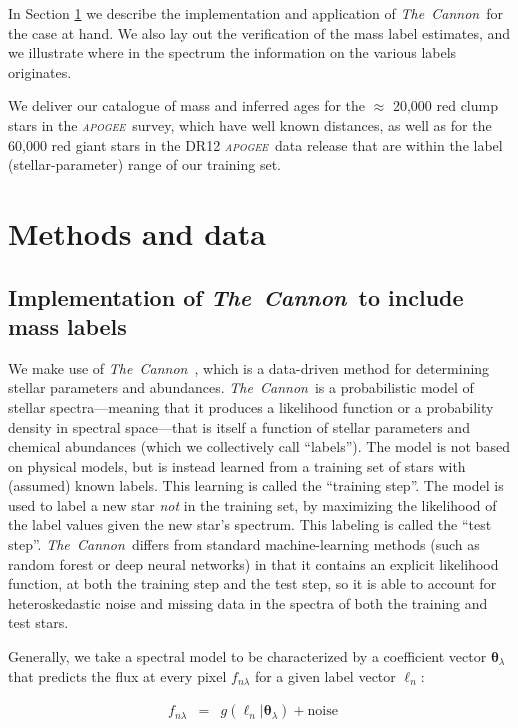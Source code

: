 \documentclass[12pt, preprint]{aastex}
\newcommand{\project}[1]{\textsl{#1}}
\newcommand{\tc}{\project{The~Cannon}}
\newcommand{\apogee}{\project{\textsc{apogee}}}
\newcommand{\set}[1]{\bm{#1}}
\newcommand{\starlabel}{\ell}
\newcommand{\starlabelvec}{\set{\starlabel}}
\begin{document}
In Section \ref{sec:methods} we describe the implementation and application of \tc\ for the case at hand. We also lay out the verification of the mass label estimates, and we illustrate where in the spectrum the information on the various labels originates. 

We deliver our catalogue of mass and inferred ages for the $\approx$ 20,000 red clump stars in the \apogee\ survey, which have well known distances, as well as for the 60,000 red giant stars in the DR12 \apogee\ data release that are within the label (stellar-parameter) range of our training set.


\section{Methods and data}
\label{sec:methods}

\subsection{Implementation of \tc\ to include mass labels}

We make use of \tc\ \citep{Ness2015}, which is a data-driven method for
determining stellar parameters and abundances.
\tc\ is a probabilistic model of stellar spectra---meaning that it
produces a likelihood function or a probability density in spectral
space---that is itself a function of stellar parameters and chemical
abundances (which we collectively call ``labels'').
The model is not based on physical models, but is instead learned
from a training set of stars with (assumed) known labels.
This learning is called the ``training step''.
The model is used to label a new star \emph{not} in the training set,
by maximizing the likelihood of the label values given the new star's
spectrum.
This labeling is called the ``test step''.
\tc\ differs from standard machine-learning methods
(such as random forest or deep neural networks) in that it contains an
explicit likelihood function, at both the training step and the test
step, so it is able to account for heteroskedastic noise and missing
data in the spectra of both the training and test stars.

Generally, we take a spectral model to be characterized by a coefficient vector $\set{\theta}_\lambda$
that predicts the flux at every pixel $f_{n\lambda}$ for a given label vector $\starlabelvec_n$:


\begin{eqnarray}
f_{n\lambda} &=&
g(\starlabelvec_n |  \set{\theta}_\lambda) + \mbox{noise}
\label{eq:specmodel}\quad 
\end{eqnarray}
\end{document}
